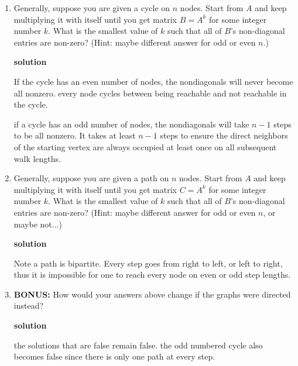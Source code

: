 \documentclass{article}
\begin{document}
\begin{enumerate}
    $$A^3  = \begin{pmatrix} 0 & 2 & 0 & 1 & 0 \\ 2 & 0 & 3 & 0 & 1 \\ 0 & 3 & 0 & 3 & 0 \\ 1 & 0 & 3 & 0 & 2 \\ 0 & 1 & 0 & 2 & 0 \end{pmatrix}$$

    \item Generally, suppose you are given a cycle on $n$ nodes. Start from $A$ and keep multiplying it with itself until you get matrix $B=A^k$ for some integer number $k$. What is the smallest value of $k$ such that all of $B$'s non-diagonal entries are non-zero? (Hint: maybe different answer for odd or even $n$.)
    
    \textbf{solution}

    If the cycle has an even number of nodes, the nondiagonals will never become all nonzero. every node cycles between being reachable and not reachable in the cycle. 

    if a cycle has an odd number of nodes, the nondiagonals will take \(n-1\) steps to be all nonzero. It takes at least \(n-1\) steps to ensure the direct neighbors of the starting vertex are always occupied at least once on all subsequent walk lengths. 

    


    \item Generally, suppose you are given a path on $n$ nodes. Start from $A$ and keep multiplying it with itself until you get matrix $C=A^k$ for some integer number $k$. What is the smallest value of $k$ such that all of $B$'s non-diagonal entries are non-zero? (Hint: maybe different answer for odd or even $n$, or maybe not...)
    
    \textbf{solution}

    Note a path is bipartite. Every step goes from right to left, or left to right, thus it is impossible for one to reach every node on even or odd step lengths. 



    \item \textbf{BONUS:} How would your answers above change if the graphs were directed instead?
    

    \textbf{solution}

    the solutions that are false remain false. the odd numbered cycle also becomes false since there is only one path at every step. 
\end{enumerate}
\end{document}

